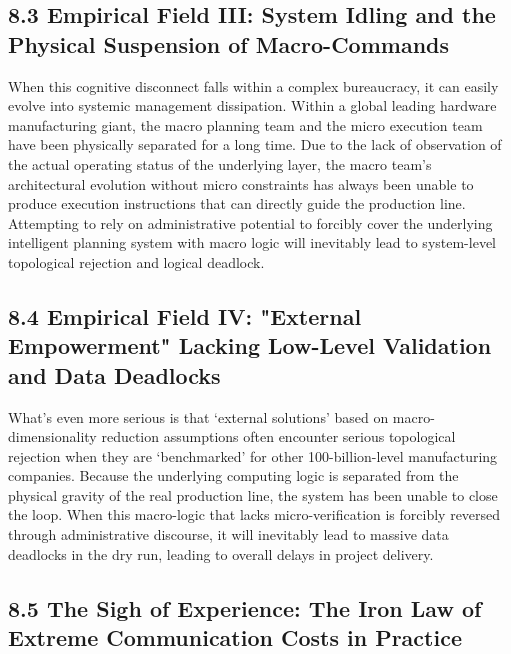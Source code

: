 \documentclass[11pt,a4paper]{article}
\begin{document}
\subsection*{8.3 Empirical Field III: System Idling and the Physical Suspension of Macro-Commands}


When this cognitive disconnect falls within a complex bureaucracy, it can easily evolve into systemic management dissipation. Within a global leading hardware manufacturing giant, the macro planning team and the micro execution team have been physically separated for a long time. Due to the lack of observation of the actual operating status of the underlying layer, the macro team's architectural evolution without micro constraints has always been unable to produce execution instructions that can directly guide the production line. Attempting to rely on administrative potential to forcibly cover the underlying intelligent planning system with macro logic will inevitably lead to system-level topological rejection and logical deadlock.


\subsection*{8.4 Empirical Field IV: "External Empowerment" Lacking Low-Level Validation and Data Deadlocks}


What’s even more serious is that ‘external solutions’ based on macro-dimensionality reduction assumptions often encounter serious topological rejection when they are ‘benchmarked’ for other 100-billion-level manufacturing companies. Because the underlying computing logic is separated from the physical gravity of the real production line, the system has been unable to close the loop. When this macro-logic that lacks micro-verification is forcibly reversed through administrative discourse, it will inevitably lead to massive data deadlocks in the dry run, leading to overall delays in project delivery.


\subsection*{8.5 The Sigh of Experience: The Iron Law of Extreme Communication Costs in Practice}
\end{document}
